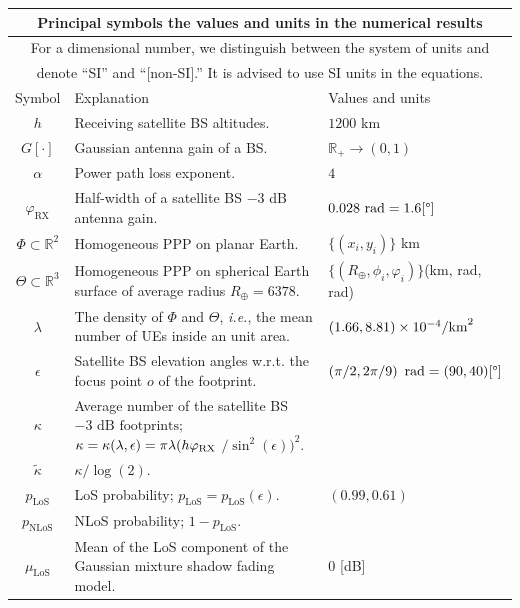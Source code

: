 \documentclass[lettersize,journal]{IEEEtran}
\newcommand{\rEarth}{R_{\oplus}}
\newcommand{\R}{\mathbb{R}}
\begin{document}
\begin{table}
  \begin{center}
    \begin{tabular}{|c|p{4.5cm}|p{1.9cm}|}
      \multicolumn{3}{c}{\textbf{Principal symbols the values and units in the numerical results}} \\
      \toprule
      \multicolumn{3}{|c|}{\scriptsize{For a dimensional number, we distinguish between the system of units and}} \\
      \multicolumn{3}{|c|}{\scriptsize{ denote ``SI'' and ``[non-SI].'' It is advised to use SI units in the equations.}} \\ 
      \hline
      Symbol& Explanation &Values and units
      \\ 
      \hline 
      $h$ & Receiving satellite BS altitudes. &$1200$ km  \\
      $G[\cdot]$ &Gaussian antenna gain of a BS.&$\R_+ \rightarrow (0,1)$ \\
      $\alpha$ &Power path loss exponent.& $4$\\
      $\varphi_{\text{RX}}$ & Half-width of a satellite BS $-3$ dB antenna gain.&$0.028 \text{ rad}\break =1.6[\degree]$ \\
      $\Phi\subset \R^2$ &Homogeneous PPP on planar Earth. & $\{(x_i,y_i)\}$ km\\
      $\Theta \subset \R^3 $ & Homogeneous PPP on spherical Earth surface of average radius $\rEarth=6378$. &$\{(\rEarth,\phi_i,\varphi_i)\}$\break (km, rad, rad) \\
      $\lambda$ & The density of $\Phi$ and $\Theta$, \textit{i.e.}, the mean number of UEs inside an unit area.&$(1.66,8.81)\break\times10^{-4}\text{/km}^2$\\
      $\epsilon$&Satellite BS elevation angles w.r.t. the focus point $\textit{o}$ of the footprint.&$\left({\pi}/{2},{2\pi}/{9}\right)\text{ rad}\break=(90,40)[\degree]$\\
      $\kappa$  & Average number of  the satellite BS $-3 \text{ dB footprints};$ \hfill \break $\kappa =\kappa(\lambda,\epsilon) = \pi \lambda (h\varphi_{\textup{RX}}$ $/\sin^2(\epsilon))^2.$& \\
      ${\tilde{\kappa}}$ &  $\kappa/\log(2)$.& \\
      $p_{\text{LoS}}$& LoS probability; $p_{\text{LoS}} = p_{\text{LoS}}(\epsilon)$. & $(0.99,0.61)$\\
      $p_{\text{NLoS}}$& NLoS probability; $1-p_{\text{LoS}}$. & \\
      $\mu_{\text{LoS}}$& Mean of the LoS component of the Gaussian mixture shadow fading model. & $0$ [dB] \\

\end{tabular}
\end{center}
\end{table}
\end{document}
